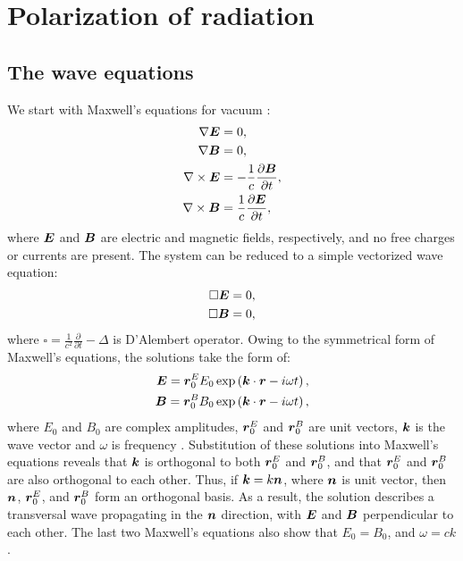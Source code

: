 \chapter{Polarization of radiation}
\section{The wave equations}
We start with Maxwell's equations for vacuum \citep{RadiationProcesses}:
\begin{equation}
    \begin{aligned}
        \nabla \boldsymbol{E} & = 0,\\
        \nabla \boldsymbol{B} & = 0,\\
        \nabla \times \boldsymbol{E} & = - \frac{1}{c} \frac{\partial \boldsymbol{B}}{\partial t}, \\
        \nabla \times  \boldsymbol{B} & = \frac{1}{c} \frac{\partial \boldsymbol{E}}{\partial t},
    \end{aligned}
\end{equation}
where $\boldsymbol{E}$ and $\boldsymbol{B}$ are electric and magnetic fields, respectively, and no free charges or currents are present.
The system can be reduced to a simple vectorized wave equation:
\begin{equation}
    \begin{aligned}
        \square \boldsymbol{E} = 0,\\
        \square \boldsymbol{B} = 0,
    \end{aligned}
\end{equation}
where $\square = \frac{1}{c^2}\frac{\partial}{\partial t} - \Delta$ is D'Alembert operator.
Owing to the symmetrical form of Maxwell's equations, the solutions take the form of: 
\begin{equation}
    \begin{aligned}
        \label{eq:wave_sol}
        \boldsymbol{E} = \boldsymbol{r}_0^EE_0\exp\left(\boldsymbol{k} \cdot \boldsymbol{r} - i \omega t\right), \\
        \boldsymbol{B} = \boldsymbol{r}_0^BB_0\exp\left(\boldsymbol{k} \cdot \boldsymbol{r} - i \omega t\right),
    \end{aligned}
\end{equation}
where $E_0$ and $B_0$ are complex amplitudes, $\boldsymbol{r}_0^E$ and $\boldsymbol{r}_0^B$ are unit vectors, $\boldsymbol{k}$ is the wave vector and $\omega$ is frequency \citep{RadiationProcesses}. 
Substitution of these solutions into Maxwell's equations reveals that $\boldsymbol{k}$ is orthogonal to both $\boldsymbol{r}_0^E$ and $\boldsymbol{r}_0^B$, and that $\boldsymbol{r}_0^E$ and $\boldsymbol{r}_0^B$ are also orthogonal to each other.
Thus, if $\boldsymbol{k} = k\boldsymbol{n}$, where $\boldsymbol{n}$ is unit vector, then $\boldsymbol{n}$, $\boldsymbol{r}_0^E$, and $\boldsymbol{r}_0^B$ form an orthogonal basis.
As a result, the solution describes a transversal wave propagating in the $\boldsymbol{n}$ direction, with $\boldsymbol{E}$ and $\boldsymbol{B}$ perpendicular to each other.
The last two Maxwell's equations also show that $E_0 = B_0$, and $\omega = ck$.

